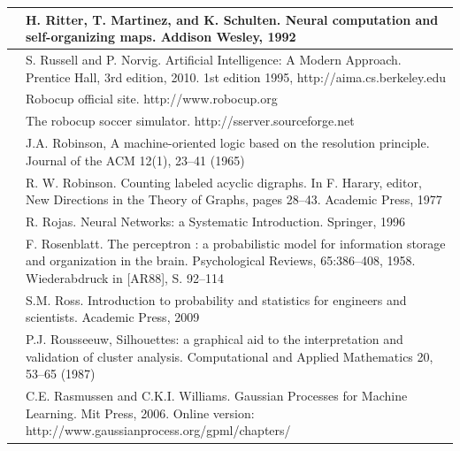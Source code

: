 \documentclass[10pt]{book}
\begin{document}
\begin{tabular}{|l|l|}
\hline [RMS92] & H. Ritter, T. Martinez, and K. Schulten. Neural computation and self-organizing maps. Addison Wesley, 1992 \\
\hline [RN10] & S. Russell and P. Norvig. Artificial Intelligence: A Modern Approach. Prentice Hall, 3rd edition, 2010. 1st edition 1995, http://aima.cs.berkeley.edu \\
\hline [Roba] & Robocup official site. http://www.robocup.org \\
\hline [Robb] & The robocup soccer simulator. http://sserver.sourceforge.net \\
\hline [Rob65] & J.A. Robinson, A machine-oriented logic based on the resolution principle. Journal of the ACM 12(1), 23–41 (1965) \\
\hline [Rob77] & R. W. Robinson. Counting labeled acyclic digraphs. In F. Harary, editor, New Directions in the Theory of Graphs, pages 28–43. Academic Press, 1977 \\
\hline [Roj96] & R. Rojas. Neural Networks: a Systematic Introduction. Springer, 1996 \\
\hline [Ros58] & F. Rosenblatt. The perceptron : a probabilistic model for information storage and organization in the brain. Psychological Reviews, 65:386–408, 1958. Wiederabdruck in [AR88], S. 92–114 \\
\hline [Ros09] & S.M. Ross. Introduction to probability and statistics for engineers and scientists. Academic Press, 2009 \\
\hline [Rou87] & P.J. Rousseeuw, Silhouettes: a graphical aid to the interpretation and validation of cluster analysis. Computational and Applied Mathematics 20, 53–65 (1987) \\
\hline [RW06] & C.E. Rasmussen and C.K.I. Williams. Gaussian Processes for Machine Learning. Mit Press, 2006. Online version: http://www.gaussianprocess.org/gpml/chapters/ \\
\hline
\end{tabular}
\end{document}
